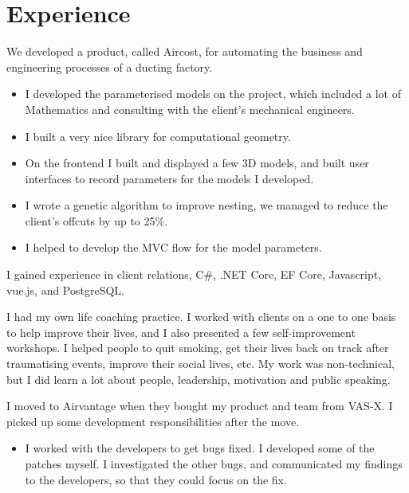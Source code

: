 \documentclass[a4paper]{twentysecondcv} %
\begin{document}

\section{Experience}

\begin{twenty} %
    {We developed a product, called Aircost, for automating the business and engineering processes of a ducting factory.
    \begin{itemize}
        \item I developed the parameterised models on the project, which included a lot of Mathematics and consulting with the client's mechanical engineers.
        \item I built a very nice library for computational geometry.
        \item On the frontend I built and displayed a few 3D models, and built user interfaces to record parameters for the models I developed.
        \item I wrote a genetic algorithm to improve nesting, we managed to reduce the client's offcuts by up to 25\%.
        \item I helped to develop the MVC flow for the model parameters.
    \end{itemize}
    I gained experience in client relations, C\#, .NET Core, EF Core, Javascript, vue.js, and PostgreSQL.}
    {I had my own life coaching practice. I worked with clients on a one to one basis to help improve their lives, and I also presented a few self-improvement workshops. I helped people to quit smoking, get their lives back on track after traumatising events, improve their social lives, etc. My work was non-technical, but I did learn a lot about people, leadership, motivation and public speaking.}
    {I moved to Airvantage when they bought my product and team from VAS-X. I picked up some development responsibilities after the move.
    \begin{itemize}
        \item I worked with the developers to get bugs fixed. I developed some of the patches myself. I investigated the other bugs, and communicated my findings to the developers, so that they could focus on the fix.

\end{itemize}}
\end{twenty}
\end{document}
